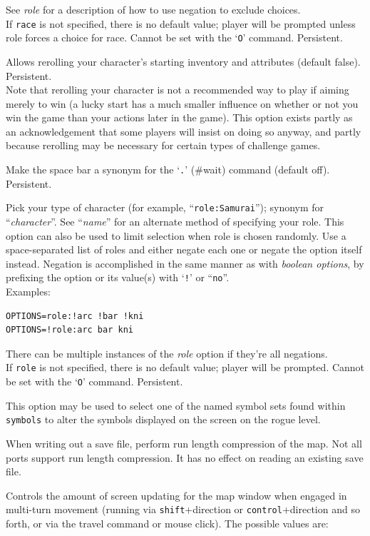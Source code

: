 \documentclass[titlepage]{article}
\begin{document}
\begin{description}[font=\mdseries\itshape]
See \textit{role}
for a description of how to use negation to exclude choices.
\\
If \texttt{race} is not specified, there is no default value;
player will be prompted unless role forces a choice for race.
Cannot be set with the `\texttt{O}' command.  Persistent.
\item[reroll]
Allows rerolling your character's starting inventory and attributes (default
false).  Persistent.
\\
Note that rerolling your character is not a recommended way to play if aiming
merely to win (a lucky start has a much smaller influence on whether or not
you win the game than your actions later in the game).  This option exists
partly as an acknowledgement that some players will insist on doing so anyway,
and partly because rerolling may be necessary for certain types of challenge
games.
\item[rest\textunderscore on\textunderscore space]
Make the space bar a synonym for the `\texttt{.}' (\#wait) command (default off).
Persistent.
\item[role]
Pick your type of character (for example, ``\texttt{role:Samurai}'');
synonym for ``\textit{character}''.
See ``\textit{name}'' for an alternate method of specifying your role.
This option can also be used to limit selection when role is chosen
randomly.
Use a space-separated list of roles and either negate each one or negate
the option itself instead.
Negation is accomplished in the same manner as with \textit{boolean options},
by prefixing the option or its value(s) with `\texttt{!}' or ``\texttt{no}''.
\\
Examples:
\\
\begin{verbatim}
OPTIONS=role:!arc !bar !kni
OPTIONS=!role:arc bar kni
\end{verbatim}
There can be multiple instances of the \textit{role}
option if they're all negations.
\\
If \texttt{role} is not specified, there is no default value;
player will be prompted.
Cannot be set with the `\texttt{O}' command.  Persistent.
\item[roguesymset]
This option may be used to select one of the named symbol sets found within
\texttt{symbols} to alter the symbols displayed on the screen on the
rogue level.
\item[rlecomp]
When writing out a save file, perform run length compression of the map.
Not all ports support run length compression. It has no
effect on reading an existing save file.
\item[runmode]
Controls the amount of screen updating for the map window when engaged
in multi-turn movement (running via \texttt{shift}+direction
or \texttt{control}+direction
and so forth, or via the travel command or mouse click).
The possible values are:


\end{description}
\end{document}
